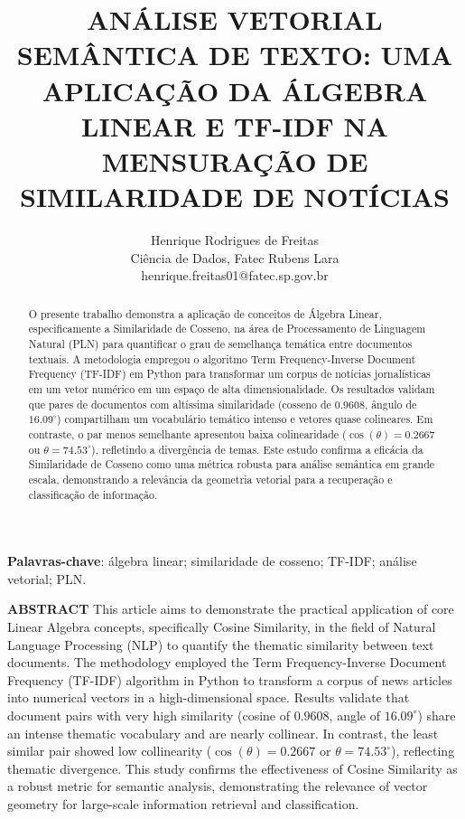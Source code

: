 \documentclass[a4paper, 12pt]{article}
\title{\textbf{ANÁLISE VETORIAL SEMÂNTICA DE TEXTO: UMA APLICAÇÃO DA ÁLGEBRA LINEAR E TF-IDF NA MENSURAÇÃO DE SIMILARIDADE DE NOTÍCIAS}}
\author{Henrique Rodrigues de Freitas \\ Ciência de Dados, Fatec Rubens Lara \\ henrique.freitas01@fatec.sp.gov.br}
\date{}
\begin{document}
\maketitle


\begin{abstract}
O presente trabalho demonstra a aplicação de conceitos de Álgebra Linear, especificamente a Similaridade de Cosseno, na área de Processamento de Linguagem Natural (PLN) para quantificar o grau de semelhança temática entre documentos textuais. A metodologia empregou o algoritmo Term Frequency-Inverse Document Frequency (TF-IDF) em Python para transformar um corpus de notícias jornalísticas em um vetor numérico em um espaço de alta dimensionalidade. Os resultados validam que pares de documentos com altíssima similaridade (cosseno de $0.9608$, ângulo de $16.09^\circ$) compartilham um vocabulário temático intenso e vetores quase colineares. Em contraste, o par menos semelhante apresentou baixa colinearidade ($\cos(\theta)=0.2667$ ou $\theta=74.53^\circ$), refletindo a divergência de temas. Este estudo confirma a eficácia da Similaridade de Cosseno como uma métrica robusta para análise semântica em grande escala, demonstrando a relevância da geometria vetorial para a recuperação e classificação de informação.
\end{abstract}

\vspace{0.5cm}
\noindent\textbf{Palavras-chave}: álgebra linear; similaridade de cosseno; TF-IDF; análise vetorial; PLN.

\vspace{1cm}
\noindent\textbf{ABSTRACT}
This article aims to demonstrate the practical application of core Linear Algebra concepts, specifically Cosine Similarity, in the field of Natural Language Processing (NLP) to quantify the thematic similarity between text documents. The methodology employed the Term Frequency-Inverse Document Frequency (TF-IDF) algorithm in Python to transform a corpus of news articles into numerical vectors in a high-dimensional space. Results validate that document pairs with very high similarity (cosine of $0.9608$, angle of $16.09^\circ$) share an intense thematic vocabulary and are nearly collinear. In contrast, the least similar pair showed low collinearity ($\cos(\theta)=0.2667$ or $\theta=74.53^\circ$), reflecting thematic divergence. This study confirms the effectiveness of Cosine Similarity as a robust metric for semantic analysis, demonstrating the relevance of vector geometry for large-scale information retrieval and classification.
\end{document}
